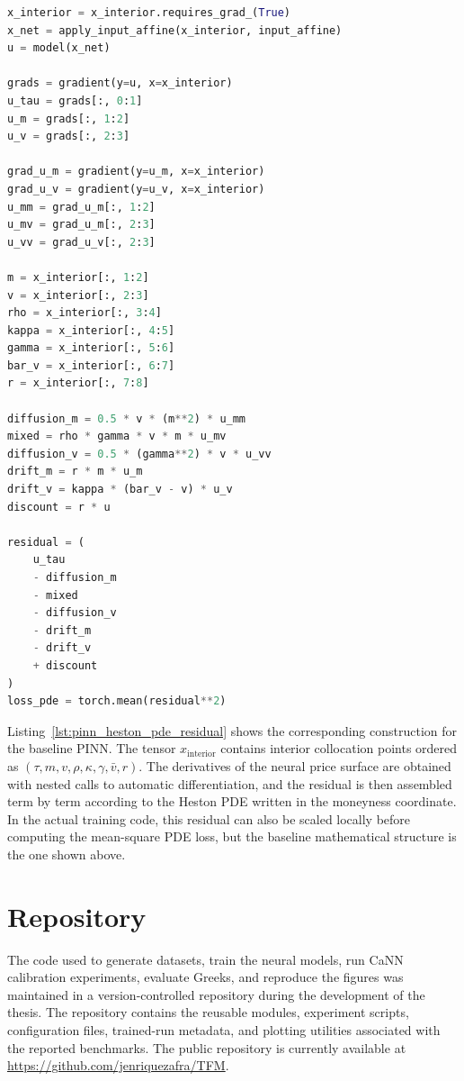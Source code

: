 \begin{lstlisting}[language=Python, caption={Construction of the Heston PDE residual used by the baseline PINN. The code shows the moneyness-coordinate version used in the price-space PINN loss, omitting input checks and optional residual normalization for clarity.}, label={lst:pinn_heston_pde_residual}]
x_interior = x_interior.requires_grad_(True)
x_net = apply_input_affine(x_interior, input_affine)
u = model(x_net)

grads = gradient(y=u, x=x_interior)
u_tau = grads[:, 0:1]
u_m = grads[:, 1:2]
u_v = grads[:, 2:3]

grad_u_m = gradient(y=u_m, x=x_interior)
grad_u_v = gradient(y=u_v, x=x_interior)
u_mm = grad_u_m[:, 1:2]
u_mv = grad_u_m[:, 2:3]
u_vv = grad_u_v[:, 2:3]

m = x_interior[:, 1:2]
v = x_interior[:, 2:3]
rho = x_interior[:, 3:4]
kappa = x_interior[:, 4:5]
gamma = x_interior[:, 5:6]
bar_v = x_interior[:, 6:7]
r = x_interior[:, 7:8]

diffusion_m = 0.5 * v * (m**2) * u_mm
mixed = rho * gamma * v * m * u_mv
diffusion_v = 0.5 * (gamma**2) * v * u_vv
drift_m = r * m * u_m
drift_v = kappa * (bar_v - v) * u_v
discount = r * u

residual = (
    u_tau
    - diffusion_m
    - mixed
    - diffusion_v
    - drift_m
    - drift_v
    + discount
)
loss_pde = torch.mean(residual**2)
\end{lstlisting}

Listing~\ref{lst:pinn_heston_pde_residual} shows the corresponding construction for the baseline PINN. The tensor \(x_{\mathrm{interior}}\) contains interior collocation points ordered as \((\tau,m,v,\rho,\kappa,\gamma,\bar v,r)\). The derivatives of the neural price surface are obtained with nested calls to automatic differentiation, and the residual is then assembled term by term according to the Heston PDE written in the moneyness coordinate. In the actual training code, this residual can also be scaled locally before computing the mean-square PDE loss, but the baseline mathematical structure is the one shown above.

\section{Repository}

The code used to generate datasets, train the neural models, run CaNN calibration experiments, evaluate Greeks, and reproduce the figures was maintained in a version-controlled repository during the development of the thesis. The repository contains the reusable modules, experiment scripts, configuration files, trained-run metadata, and plotting utilities associated with the reported benchmarks. The public repository is currently available at \url{https://github.com/jenriquezafra/TFM}.
